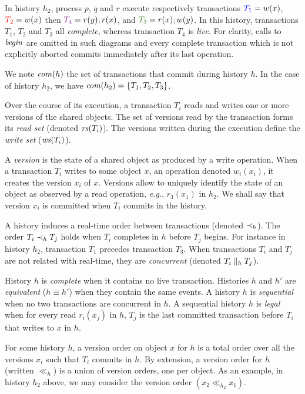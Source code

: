 In history $h_2$, process $p$, $q$ and $r$ execute respectively transactions ${\color{blue}{T_1}}=w(x)$, ${\color{red}{T_2}}=w(x)$ then ${\color{Purple}{T_4}}=r(y);r(x)$, and ${\color{OliveGreen}{T_3}}=r(x);w(y)$.
In this history, transactions $T_1$, $T_2$ and $T_3$ all \emph{complete}, whereas transaction $T_4$ is \emph{live}.
For clarity, calls to $\stmBeginFunction$ are omitted in such diagrams and every complete transaction which is not explicitly aborted commits immediately after its last operation.

We note $\committed{h}$ the set of transactions that commit during history $h$.
In the case of history $h_2$, we have $\committed{h_2}=\{T_1,T_2,T_3\}$.

Over the course of its execution, a transaction $T_i$ reads and writes one or more versions of the shared objects.
The set of versions read by the transaction forms its \emph{read set} (denoted $\readSetOf{T_i}$).
The versions written during the execution define the \emph{write set} ($\writeSetOf{T_i}$).

A \emph{version} is the state of a shared object as produced by a write operation.
When a transaction $T_i$ writes to some object $x$, an operation denoted $w_i(x_i)$, it creates the version $x_i$ of $x$.
Versions allow to uniquely identify the state of an object as observed by a read operation, \emph{e.g.}, $r_3(x_1)$ in $h_2$.
We shall say that version $x_i$ is committed when $T_i$ commits in the history.

A history induces a real-time order between transactions (denoted $\hb_h$).
The order $T_i \hb_h T_j$ holds when $T_i$ completes in $h$ before $T_j$ begins.
For instance in history $h_2$, transaction $T_1$ precedes transaction $T_3$.
When transactions $T_i$ and $T_j$ are not related with real-time, they are \emph{concurrent} (denoted $T_i \cc_h T_j$).

History $h$ is \emph{complete} when it contains no live transaction.
Histories $h$ and $h'$ are \emph{equivalent} ($h \equiv h'$) when they contain the same events.
A history $h$ is \emph{sequential} when no two transactions are concurrent in $h$.
A sequential history $h$ is \emph{legal} when for every read $r_i(x_j)$ in $h$, $T_j$ is the last committed transaction before $T_i$ that writes to $x$ in $h$.

For some history $h$, a version order on object $x$ for $h$ is a total order over all the versions $x_i$ such that $T_i$ commits in $h$.
By extension, a version order for $h$ (written $\ll_h$) is a union of version orders, one per object.
As an example, in history $h_2$ above, we may consider the version order $(x_2 \ll_{h_2} x_1)$.

